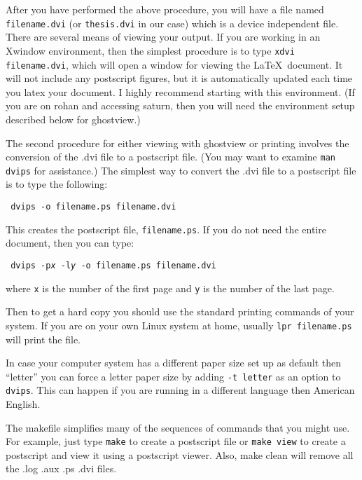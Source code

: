 After you have performed the above procedure, you will have a file
named \texttt{filename.dvi} (or \texttt{thesis.dvi} in our case) which
is a device independent file. There are several means of viewing your
output. If you are working in an Xwindow environment, then the
simplest procedure is to type \texttt{xdvi filename.dvi}, which will
open a window for viewing the \LaTeX\ document. It will not include
any postscript figures, but it is automatically updated each time you
latex your document. I highly recommend starting with this
environment. (If you are on rohan and accessing saturn, then you will
need the environment setup described below for ghostview.)

The second procedure for either viewing with ghostview or printing
involves the conversion of the .dvi file to a postscript file. (You
may want to examine \texttt{man dvips} for assistance.) The simplest
way to convert the .dvi file to a postscript file is to type the
following: \vspace{.15in}

\texttt{
  dvips -o filename.ps filename.dvi
}
\vspace{.15in}

\noindent
This creates the postscript file, \texttt{filename.ps}. If you do not
need the entire document, then you can type: \vspace{.15in}

\texttt{
  dvips -p\emph{x} -l\emph{y} -o filename.ps filename.dvi
}
\vspace{.15in}

\noindent
where \texttt{x} is the number of the first page and \texttt{y} is the
number of the last page.

Then to get a hard copy you should use the standard printing commands
of your system.  If you are on your own Linux system at home, usually
\texttt{lpr filename.ps} will print the file.

In case your computer system has a different paper size set up as
default then ``letter'' you can force a letter paper size by adding
\texttt{-t letter} as an option to \texttt{dvips}.  This can happen if
you are running in a different language then American English.

The makefile simplifies many of the sequences of commands that you
might use.  For example, just type \texttt{make} to create a
postscript file or \texttt{make view} to create a postscript and view
it using a postscript viewer. Also, make clean will remove all the
.log .aux .ps .dvi files.




